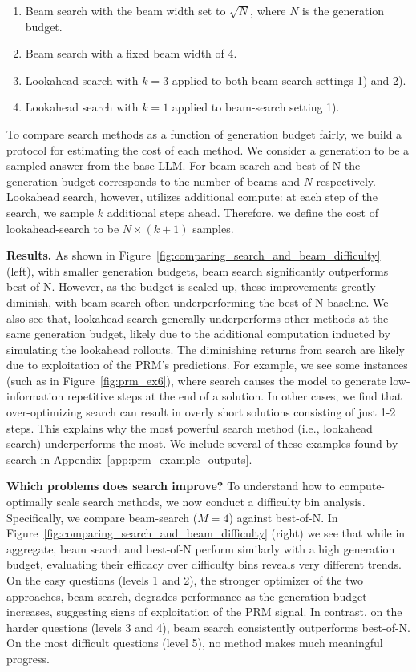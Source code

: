 \documentclass[11pt, letterpaper, logo]{googledeepmind}
\begin{document}
\renewcommand\labelenumi{\theenumi)}
\begin{enumerate}
\vspace{-0.35cm}
    \item Beam search with the beam width set to $\sqrt{N}$, where $N$ is the generation budget.
    \item Beam search with a fixed beam width of 4.
    \item Lookahead search with $k=3$ applied to both beam-search settings 1) and 2).
    \item Lookahead search with $k=1$ applied to beam-search setting 1). \vspace{-0.3cm}
\end{enumerate}
To compare search methods as a function of generation budget fairly, we build a protocol for estimating the cost of each method. We consider a generation to be a sampled answer from the base LLM. For beam search and best-of-N the generation budget corresponds to the number of beams and $N$ respectively. Lookahead search, however, utilizes additional compute: at each step of the search, we sample $k$ additional steps ahead. Therefore, we define the cost of lookahead-search to be $N \times (k+1)$ samples. 

\textbf{Results.} As shown in Figure~\ref{fig:comparing_search_and_beam_difficulty} (left), with smaller generation budgets, beam search significantly outperforms best-of-N. However, as the budget is scaled up, these improvements greatly diminish, with beam search often underperforming the best-of-N baseline. We also see that, lookahead-search generally underperforms other methods at the same generation budget, likely due to the additional computation inducted by simulating the lookahead rollouts.
The diminishing returns from search are likely due to exploitation of the PRM's predictions. For example, we see some instances (such as in Figure~\ref{fig:prm_ex6}), where search causes the model to generate low-information repetitive steps at the end of a solution. In other cases, we find that over-optimizing search can result in overly short solutions consisting of just 1-2 steps.
This explains why the most powerful search method (i.e., lookahead search) underperforms the most. We include several of these examples found by search in Appendix~\ref{app:prm_example_outputs}.

\textbf{Which problems does search improve?} To understand how to compute-optimally scale search methods, we now conduct a difficulty bin analysis. Specifically, we compare beam-search ($M=4$) against best-of-N. In Figure~\ref{fig:comparing_search_and_beam_difficulty} (right) we see that while in aggregate, beam search and best-of-N perform similarly with a high generation budget, evaluating their efficacy over difficulty bins reveals very different trends.
On the easy questions (levels 1 and 2), the stronger optimizer of the two approaches, beam search, degrades performance as the generation budget increases, suggesting signs of exploitation of the PRM signal.
In contrast, on the harder questions (levels 3 and 4), beam search consistently outperforms best-of-N. On the most difficult questions (level 5), no method makes much meaningful progress. 
\end{document}
